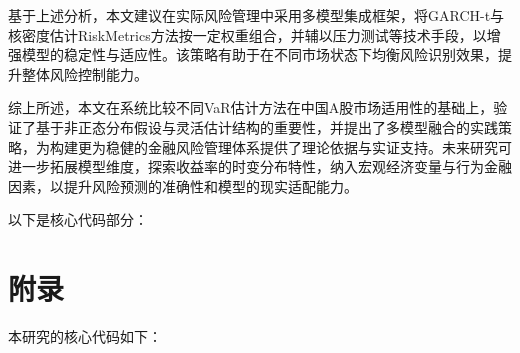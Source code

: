 \documentclass[12pt, a4paper]{article}
\begin{document}
基于上述分析，本文建议在实际风险管理中采用多模型集成框架，将GARCH-t与核密度估计RiskMetrics方法按一定权重组合，并辅以压力测试等技术手段，以增强模型的稳定性与适应性。该策略有助于在不同市场状态下均衡风险识别效果，提升整体风险控制能力。

综上所述，本文在系统比较不同VaR估计方法在中国A股市场适用性的基础上，验证了基于非正态分布假设与灵活估计结构的重要性，并提出了多模型融合的实践策略，为构建更为稳健的金融风险管理体系提供了理论依据与实证支持。未来研究可进一步拓展模型维度，探索收益率的时变分布特性，纳入宏观经济变量与行为金融因素，以提升风险预测的准确性和模型的现实适配能力。

\printbibliography[title=参考文献]

以下是核心代码部分：

\section{附录}

本研究的核心代码如下：
\end{document}
